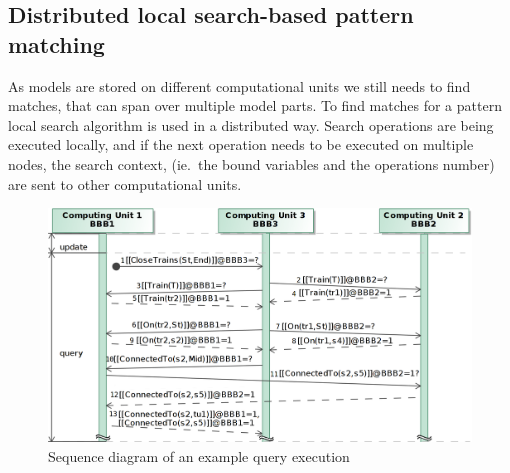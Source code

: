 \subsection{Distributed local search-based pattern matching}

As models are stored on different computational units we still needs to find matches, that can span over multiple model parts. To find matches for a pattern local search algorithm is used in a distributed way. Search operations are being executed locally, and if the next operation needs to be executed on multiple nodes, the search context, (ie.\ the bound variables and the operations number) are sent to other computational units.

\begin{figure}[h]
	\begin{center}
		\includegraphics[width=1\textwidth]{figures/seq-diagram-query-exec.png}
		\caption{Sequence diagram of an example query execution}
		\label{fig:distibuted-exec}
		
	\end{center}
\end{figure}



